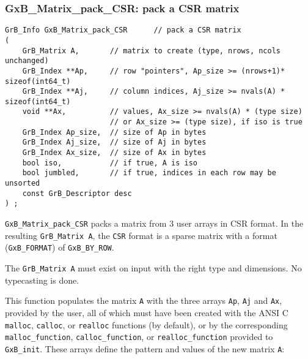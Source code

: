 \documentclass[12pt]{article}
\begin{document}
\newpage
\subsubsection{{\sf GxB\_Matrix\_pack\_CSR:} pack a CSR matrix}
\label{matrix_pack_csr}

\begin{mdframed}[userdefinedwidth=6in]
{\footnotesize
\begin{verbatim}
GrB_Info GxB_Matrix_pack_CSR      // pack a CSR matrix
(
    GrB_Matrix A,       // matrix to create (type, nrows, ncols unchanged)
    GrB_Index **Ap,     // row "pointers", Ap_size >= (nrows+1)* sizeof(int64_t)
    GrB_Index **Aj,     // column indices, Aj_size >= nvals(A) * sizeof(int64_t)
    void **Ax,          // values, Ax_size >= nvals(A) * (type size)
                        // or Ax_size >= (type size), if iso is true
    GrB_Index Ap_size,  // size of Ap in bytes
    GrB_Index Aj_size,  // size of Aj in bytes
    GrB_Index Ax_size,  // size of Ax in bytes
    bool iso,           // if true, A is iso
    bool jumbled,       // if true, indices in each row may be unsorted
    const GrB_Descriptor desc
) ;
\end{verbatim}
} \end{mdframed}

\verb'GxB_Matrix_pack_CSR' packs a matrix from 3 user arrays in CSR format.
In the resulting \verb'GrB_Matrix A', the \verb'CSR' format is a sparse matrix
with a format (\verb'GxB_FORMAT') of \verb'GxB_BY_ROW'.

The \verb'GrB_Matrix A' must exist on input with the right type and
dimensions.  No typecasting is done.

This function populates the matrix
\verb'A' with the three arrays \verb'Ap', \verb'Aj' and \verb'Ax', provided by
the user, all of which must have been created with the ANSI C \verb'malloc',
\verb'calloc', or \verb'realloc' functions (by default), or by the
corresponding \verb'malloc_function', \verb'calloc_function', or
\verb'realloc_function' provided to \verb'GxB_init'.  These arrays define the
pattern and values of the new matrix \verb'A':
\end{document}
